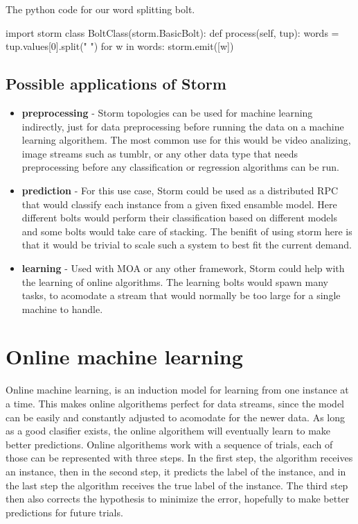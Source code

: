 \documentclass[journal]{IEEEtran/IEEEtran}
\begin{document}
The python code for our word splitting bolt.

\begin{code}

import storm
class BoltClass(storm.BasicBolt):
    def process(self, tup):
        words = tup.values[0].split(" ")
        for w in words:
            storm.emit([w])

\end{code}


\subsection{Possible applications of Storm}


\begin{itemize}
    \item \textbf{preprocessing} - Storm topologies can be used for machine learning indirectly, just for data preprocessing before running the data on a machine learning algorithem. The most common use for this would be video analizing, image streams such as tumblr, or any other data type that needs preprocessing before any classification or regression algorithms can be run.

    \item \textbf{prediction} - For this use case, Storm could be used as a distributed RPC that would classify each instance from a given fixed ensamble model. Here different bolts would perform their classification based on different models and some bolts would take care of stacking. The benifit of using storm here is that it would be trivial to scale such a system to best fit the current demand. 

    \item \textbf{learning} - Used with MOA or any other framework, Storm could help with the learning of online algorithms. The learning bolts would spawn many tasks, to acomodate a stream that would normally be too large for a single machine to handle.
\end{itemize}


\section{Online machine learning}

Online machine learning, is an induction model for learning from one instance at a time. This makes online algorithems perfect for data streams, since the model can be easily and constantly adjusted to acomodate for the newer data. As long as a good clasifier exists, the online algorithem will eventually learn to make better predictions. Online algorithems work with a sequence of trials, each of those can be represented with three steps. In the first step, the algorithm receives an instance, then in the second step, it predicts the label of the instance, and in the last step the algorithm receives the true label of the instance. The third step then also corrects the hypothesis to minimize the error, hopefully to make better predictions for future trials. 
\end{document}
